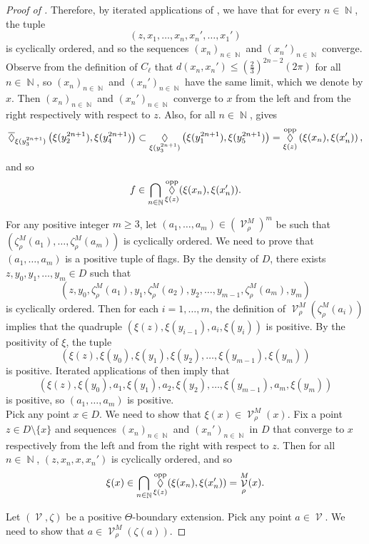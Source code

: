 \documentclass{amsart}
\theoremstyle{plain}
\theoremstyle{definition}
\DeclareMathOperator{\Diam}{\lozenge}
\newcommand{\bdext}{{\Vc^M_\rho}}
\DeclareMathOperator{\Vc}{\mathcal{V}}
\DeclareMathOperator{\Nb}{{\mathbb{N}}}
\newcommand{\opp}{\textnormal{opp}}
\newcommand{\1}{\mathbf{1}}
\begin{document}
\begin{proof}[Proof of ]
Therefore, by iterated applications of , we have that for every $n\in\Nb$, the tuple
\[(z,x_1,\dots,x_n,x_n',\dots,x_1')\]
is cyclically ordered, and so the sequences $(x_n)_{n\in\Nb}$ and $(x_n')_{n\in\Nb}$ converge. Observe from the definition of $C_\ell$ that $d(x_n,x_n')\le(\frac{2}{3})^{2n-2}(2\pi)$ for all $n\in\Nb$, so $(x_n)_{n\in\Nb}$ and $(x_n')_{n\in\Nb}$ have the same limit, which we denote by $x$. Then $(x_n)_{n\in\Nb}$ and $(x_n')_{n\in\Nb}$ converge to $x$ from the left and from the right respectively with respect to $z$. Also, for all $n\in\Nb$,  gives
\[\overline{\Diam}_{\xi(y_3^{2n+1})}\left(\xi(y_2^{2n+1}),\xi(y_4^{2n+1})\right)\subset\Diam_{\xi(y_3^{2n+1})}\left(\xi(y_1^{2n+1}),\xi(y_5^{2n+1})\right)=\Diam_{\xi(z)}^{\rm opp}\left(\xi(x_n),\xi(x_n')\right),\]
and so
\[f\in \bigcap_{n\in\Nb} \Diam^\opp_{\xi(z)}(\xi(x_n),\xi(x_n')).\]


\noindent {\bf Positivity of $(\bdext , \zeta^M_\rho)$.} For any positive integer $m\ge 3$, let $(a_1,\dots,a_m)\in(\bdext)^m$ be such that $(\zeta^M_\rho(a_1),\dots,\zeta^M_\rho(a_m))$ is cyclically ordered. We need to prove that $(a_1,\dots,a_m)$ is a positive tuple of flags. By the density of $D$, there exists $z,y_0,y_1,\dots,y_m\in D$ such that 
\[(z,y_0,\zeta^M_\rho(a_1),y_1,\zeta^M_\rho(a_2),y_2,\dots,y_{m-1},\zeta^M_\rho(a_m),y_m)\]
is cyclically ordered. Then for each $i=1,\dots,m$, the definition of $\bdext(\zeta^M_\rho(a_i))$ implies that the quadruple $(\xi(z),\xi(y_{i-1}),a_i,\xi(y_i))$ is positive. By the positivity of $\xi$, the tuple
\[(\xi(z),\xi(y_0),\xi(y_1),\xi(y_2),\dots,\xi(y_{m-1}),\xi(y_m))\]
is positive. Iterated applications of  then imply that
\[(\xi(z),\xi(y_0),a_1,\xi(y_1),a_2,\xi(y_2),\dots,\xi(y_{m-1}),a_m,\xi(y_m))\]
is positive, so $(a_1,\dots,a_m)$ is positive.\\

Pick any point $x\in D$. We need to show that $\xi(x)\in\bdext(x)$. Fix a point $z\in D\setminus \{x\}$ and sequences $(x_n)_{n\in\Nb}$ and $(x_n')_{n\in\Nb}$ in $D$ that converge to $x$ respectively from the left and from the right with respect to $z$. Then for all $n\in\Nb$, $(z,x_n,x,x_n')$ is cyclically ordered, and so  
\[\xi(x)\in\bigcap_{n\in\Nb} \Diam^\opp_{\xi(z)}(\xi(x_n),\xi(x_n'))=\bdext(x).\]

 Let $(\Vc, \zeta)$ be a positive $\Theta$-boundary extension. Pick any point $a\in \Vc$. We need to show that $a\in\bdext(\zeta(a))$.
    

\end{proof}
\end{document}
